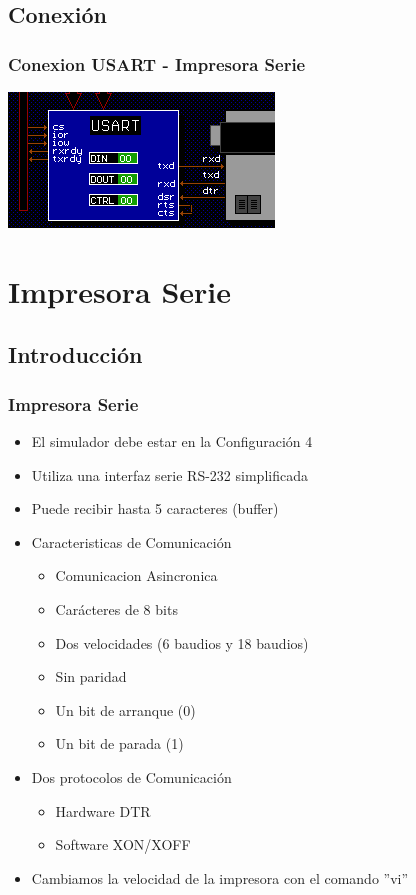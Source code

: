 \documentclass{beamer}
\begin{document}
\subsection{Conexión}
\begin{frame}[fragile]
\frametitle{Conexion USART - Impresora Serie}
\begin{center}
 \includegraphics[scale=1.00]{conexion_usart.png}
\end{center}

\end{frame}

\section{Impresora Serie}
\subsection{Introducción}
\begin{frame}[fragile]
\frametitle{Impresora Serie}
\begin{itemize}
 \item El simulador debe estar en la Configuración 4
 \item Utiliza una interfaz serie RS-232 simplificada
 \item Puede recibir hasta 5 caracteres (buffer)
 \item Caracteristicas de Comunicación
 \begin{itemize}
  \item Comunicacion Asincronica
  \item Carácteres de 8 bits
  \item Dos velocidades (6 baudios y 18 baudios)
  \item Sin paridad
  \item Un bit de arranque (0)
  \item Un bit de parada (1)
 \end{itemize}
  \item Dos protocolos de Comunicación
\begin{itemize}
 \item Hardware DTR
 \item Software XON/XOFF
\end{itemize}
\item Cambiamos la velocidad de la impresora con el comando ''vi''
\end{itemize}
\end{frame}
\end{document}
